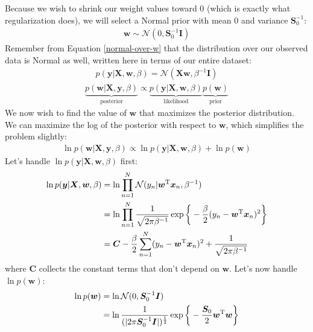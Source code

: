 \begin{derivation}
    Because we wish to shrink our weight values toward 0 (which is exactly what regularization does), we will select a Normal prior with mean 0 and variance $\boldsymbol{S}_0^{-1}$:
    \begin{align*}
        \bm{w} \sim \mathcal{N}(0, \boldsymbol{S}_0^{-1}\bm{I})
    \end{align*}
    Remember from Equation \ref{normal-over-w} that the distribution over our observed data is Normal as well, written here in terms of our entire dataset:
    \begin{align*}
        p(\bm{y} | \bm{X}, \bm{w}, \beta) = \mathcal{N}(\bm{X}\bm{w}, \beta^{-1}\bm{I})
    \end{align*}
    \begin{align*}
        \underbrace{p(\bm{w}|\bm{X},\bm{y}, \beta)}_{\text{posterior}} \propto \underbrace{p(\bm{y}| \bm{X}, \bm{w}, \beta)}_{\text{likelihood}}\underbrace{p(\bm{w})}_{\text{prior}}
    \end{align*}
    We now wish to find the value of $\bm{w}$ that maximizes the posterior distribution. We can maximize the log of the posterior with respect to $\bm{w}$, which simplifies the problem slightly:
    \begin{align*}
        \ln{p(\bm{w}|\bm{X},\bm{y}, \beta)} \propto \ln{p(\bm{y}| \bm{X}, \bm{w}, \beta)} + \ln{p(\bm{w})}
    \end{align*}
    Let's handle $\ln{p(\bm{y}| \bm{X}, \bm{w}, \beta)}$ first:
    \begin{align*}
        \ln{p(\bm{y}| \bm{X}, \bm{w}, \beta)} &= \ln{\prod_{n=1}^{N} \mathcal{N}(y_n | \bm{w}^{\mathrm T}\bm{x}_n, \beta^{-1})} \\
        &= \ln{\prod_{n=1}^{N} \frac{1}{\sqrt{2\pi\beta^{-1}}} \exp{\bigg\{-\frac{\beta}{2}(y_n - \bm{w}^{\mathrm T}\bm{x}_n)^2\bigg\}}} \\
        &= \bm{C} -\frac{\beta}{2}\sum_{n=1}^{N} (y_n - \bm{w}^{\mathrm T} \bm{x}_n)^2 + \frac{1}{\sqrt{2\pi\beta^{-1}}}
    \end{align*}
    where $\bm{C}$ collects the constant terms that don't depend on $\bm{w}$. Let's now handle $\ln{p(\bm{w})}$:
    \begin{align*}
        \ln{p(\bm{w})} &= \ln{\mathcal{N}(0, \boldsymbol{S}_0^{-1}\bm{I})} \\
        &= \ln{\frac{1}{(|2\pi\boldsymbol{S}_0^{-1}\bm{I}|)^{\frac{1}{2}}} \exp{\bigg\{-\frac{\boldsymbol{S}_0}{2} \bm{w}\T\bm{w}\bigg\}}} \\

\end{align*}
\end{derivation}

